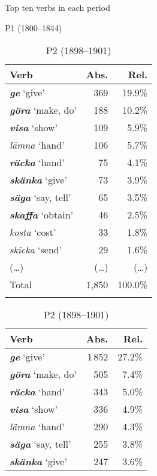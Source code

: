 \documentclass[output=paper]{langscibook}
\begin{document}
\begin{table}
\caption{Top ten verbs in each period\label{tab:valdeson:5}}
\begin{subtable}{.45\linewidth}\centering
\caption{P1 (1800–1844)}
\begin{tabularx}{\linewidth}{Xrr}
\lsptoprule
Verb & Abs.   & Rel.   \\
\midrule
\textbf{\textit{ge}} ‘give’             & 369 & 19.9\%    \\
\textbf{\textit{göra}} ‘make, do’       & 188 & 10.2\%    \\
\textbf{\textit{visa}} ‘show’           & 109 & 5.9\%     \\
\textit{lämna} ‘hand’                   & 106 & 5.7\%     \\
\textbf{\textit{räcka}} ‘hand’          & 75 & 4.1\%      \\
\textbf{\textit{skänka}} ‘give’         & 73 & 3.9\%      \\
\textbf{\textit{säga}} ‘say, tell’      & 65 & 3.5\%      \\
\textbf{\textit{skaffa}} ‘obtain’       & 46 & 2.5\%      \\
\textit{kosta} ‘cost’                   & 33 & 1.8\%      \\
\textit{skicka} ‘send’                  & 29 & 1.6\%      \\
(…) & (…) & (…) \\
\midrule
Total & 1,850 & 100.0\%  \\
\lspbottomrule
\end{tabularx}
\end{subtable}\hfill\begin{subtable}{.45\linewidth}\centering
\caption{P2 (1898–1901)}
\begin{tabularx}{\linewidth}{Xrr}
\lsptoprule
Verb & Abs.   & Rel.   \\
\midrule
 \textbf{\textit{ge}} ‘give’         & 1\,852 & 27.2\%    \\
 \textbf{\textit{göra}} ‘make, do’   & 505 & 7.4\%       \\
 \textbf{\textit{räcka}} ‘hand’      & 343 & 5.0\%       \\
 \textbf{\textit{visa}} ‘show’       & 336 & 4.9\%       \\
 \textit{lämna} ‘hand’               & 290 & 4.3\%       \\
 \textbf{\textit{säga}} ‘say, tell’  & 255 & 3.8\%       \\
 \textbf{\textit{skänka}} ‘give’    & 247 & 3.6\%        \\

\end{tabularx}
\end{subtable}
\end{table}
\end{document}
